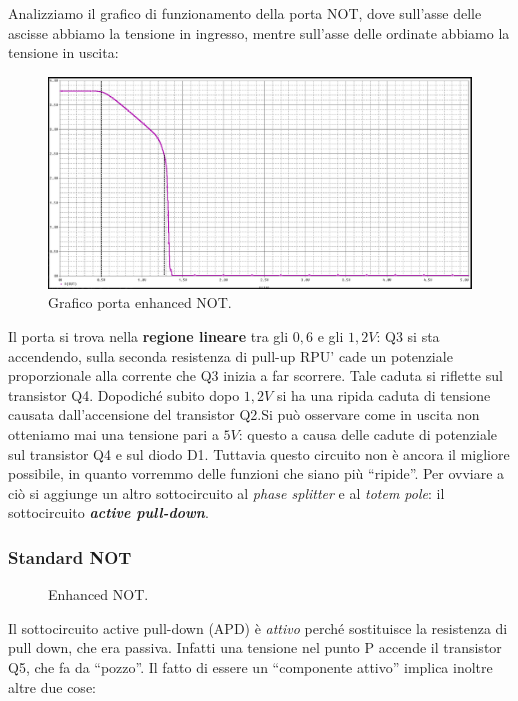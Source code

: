 \documentclass[
]{book}
\begin{document}
Analizziamo il grafico di funzionamento della porta NOT, dove sull'asse
delle ascisse abbiamo la tensione in ingresso, mentre sull'asse delle
ordinate abbiamo la tensione in uscita:

\begin{figure}
\centering
\includegraphics[width=0.5\linewidth,height=\textheight,keepaspectratio]{assets/imgs/enhanced_not.png}
\caption{Grafico porta enhanced NOT.}
\end{figure}

Il porta si trova nella \textbf{regione lineare} tra gli \(0,6\) e gli
\(1,2V\): Q3 si sta accendendo, sulla seconda resistenza di pull-up RPU'
cade un potenziale proporzionale alla corrente che Q3 inizia a far
scorrere. Tale caduta si riflette sul transistor Q4. Dopodiché subito
dopo \(1,2V\) si ha una ripida caduta di tensione causata
dall'accensione del transistor Q2.\newline Si può osservare come in
uscita non otteniamo mai una tensione pari a \(5V\): questo a causa
delle cadute di potenziale sul transistor Q4 e sul diodo D1.\newline
Tuttavia questo circuito non è ancora il migliore possibile, in quanto
vorremmo delle funzioni che siano più ``ripide''. Per ovviare a ciò si
aggiunge un altro sottocircuito al \emph{phase splitter} e al
\emph{totem pole}: il sottocircuito \textbf{\emph{active pull-down}}.

\subsubsection{Standard NOT}\label{standard-not}

\begin{figure}[H]
    \centering
    \resizebox{0.5\textwidth}{!}{}
    \caption{Enhanced NOT.}
\end{figure}

Il sottocircuito active pull-down (APD) è \emph{attivo} perché
sostituisce la resistenza di pull down, che era passiva. Infatti una
tensione nel punto P accende il transistor Q5, che fa da ``pozzo''. Il
fatto di essere un ``componente attivo'' implica inoltre altre due cose:
\end{document}

